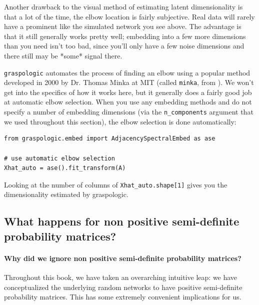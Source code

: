 Another drawback to the visual method of estimating latent dimensionality is that a lot of the time, the elbow location is fairly subjective. Real data will rarely have a prominent like the simulated network you see above. The advantage is that it still generally works pretty well; embedding into a few more dimensions than you need isn't too bad, since you'll only have a few noise dimensions and there still may be *some* signal there.

\texttt{graspologic} automates the process of finding an elbow using a popular method developed in 2000 by Dr. Thomas Minka at MIT (called \texttt{minka}, from \cite{Minka2000}). We won't get into the specifics of how it works here, but it generally does a fairly good job at automatic elbow selection. When you use any embedding methods and do not specify a number of embedding dimensions (via the \texttt{n\_components} argument that we used throughout this section), the elbow selection is done automatically:

\begin{lstlisting}[style=python]
from graspologic.embed import AdjacencySpectralEmbed as ase

# use automatic elbow selection
Xhat_auto = ase().fit_transform(A)
\end{lstlisting}

Looking at the number of columns of \texttt{Xhat\_auto.shape[1]} gives you the dimensionality estimated by graspologic. 


\subsection{What happens for non positive semi-definite probability matrices?}
\label{sec:ch6:dimest:grdpg}

\paragraph*{Why did we ignore non positive semi-definite probability matrices?}

Throughout this book, we have taken an overarching intuitive leap: we have conceptualized the underlying random networks to have positive semi-definite probability matrices. This has some extremely convenient implications for us. 

